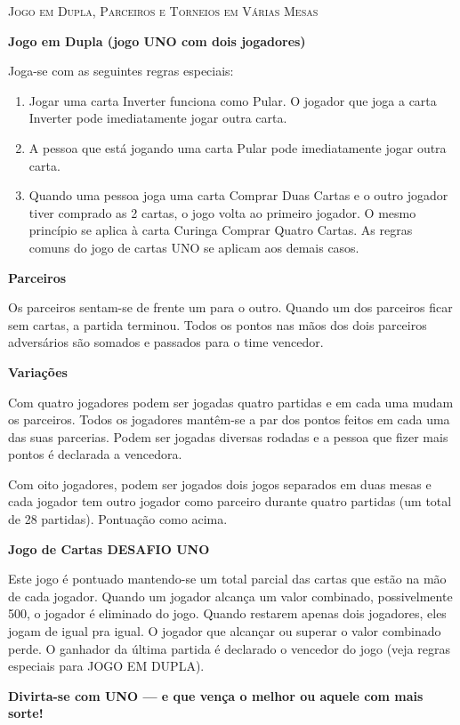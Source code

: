 \vspace{0.5cm}

\textsc{\large{Jogo em Dupla, Parceiros e Torneios em Várias Mesas}}

\textbf{Jogo em Dupla (jogo UNO com dois jogadores)}

Joga-se com as seguintes regras especiais:

\begin{enumerate}
\item{Jogar uma carta Inverter funciona como Pular. O jogador que joga a carta Inverter pode imediatamente jogar outra carta.}
\item{A pessoa que está jogando uma carta Pular pode imediatamente jogar outra carta.}
\item{Quando uma pessoa joga uma carta Comprar Duas Cartas e o outro jogador tiver comprado as 2 cartas, o jogo volta ao primeiro jogador. O mesmo princípio se aplica à carta Curinga Comprar Quatro Cartas. As regras comuns do jogo de cartas UNO se aplicam aos demais casos.}
\end{enumerate}

\textbf{Parceiros}

Os parceiros sentam-se de frente um para o outro. Quando um dos parceiros ficar sem cartas, a partida terminou. Todos os pontos nas mãos dos dois parceiros adversários são somados e passados para o time vencedor.

\textbf{Variações}

Com quatro jogadores podem ser jogadas quatro partidas e em cada uma mudam os parceiros. Todos os jogadores mantêm-se a par dos pontos feitos em cada uma das suas parcerias. Podem ser jogadas diversas rodadas e a pessoa que fizer mais pontos é declarada a vencedora.

Com oito jogadores, podem ser jogados dois jogos separados em duas mesas e cada jogador tem outro jogador como parceiro durante quatro partidas (um total de 28 partidas). Pontuação como acima.

\textbf{Jogo de Cartas DESAFIO UNO}

Este jogo é pontuado mantendo-se um total parcial das cartas que estão na mão de cada jogador. Quando um jogador alcança um valor combinado, possivelmente 500, o jogador é eliminado do jogo. Quando restarem apenas dois jogadores, eles jogam de igual pra igual. O jogador que alcançar ou superar o valor combinado perde. O ganhador da última partida é declarado o vencedor do jogo (veja regras especiais para JOGO EM DUPLA).

\textbf{Divirta-se com UNO --- e que vença o melhor ou aquele com mais sorte!}